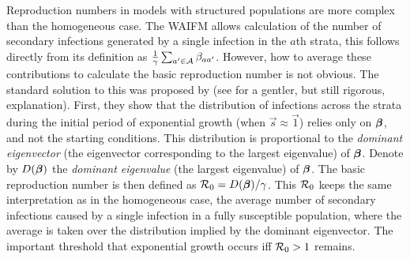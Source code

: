 \documentclass[thesis.tex]{subfiles}
\begin{document}
Reproduction numbers in models with structured populations are more complex than the homogeneous case.
The WAIFM allows calculation of the number of secondary infections generated by a single infection in the $a$th strata,  this follows directly from its definition as $\frac{1}{\gamma} \sum_{a' \in \mathcal{A}} \beta_{aa'}$. 
However, how to average these contributions to calculate the basic reproduction number is not obvious.
The standard solution to this was proposed by \textcite{diekmannDefinition} (see \textcite[chapter 7]{diekmannMathematical} for a gentler, but still rigorous, explanation).
First, they show that the distribution of infections across the strata during the initial period of exponential growth (when $\vec{s} \approx \vec{1}$) relies only on $\bm{\beta}$, and not the starting conditions.
This distribution is proportional to the \emph{dominant eigenvector} (the eigenvector corresponding to the largest eigenvalue) of $\bm{\beta}$.
Denote by $D(\bm{\beta})$ the \emph{dominant eigenvalue} (the largest eigenvalue) of $\bm{\beta}$.
The basic reproduction number is then defined as $\mathcal{R}_{0} = D(\bm{\beta}) / \gamma$.
This $\mathcal{R}_{0}$ keeps the same interpretation as in the homogeneous case, \ie the average number of secondary infections caused by a single infection in a fully susceptible population, where the average is taken over the distribution implied by the dominant eigenvector.
The important threshold that exponential growth occurs iff $\mathcal{R}_{0} > 1$ remains.
\end{document}
